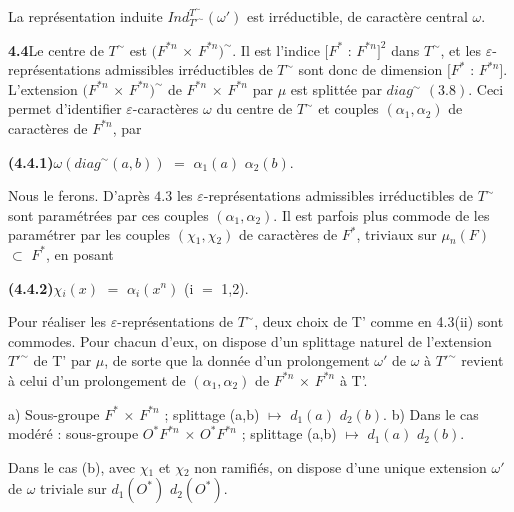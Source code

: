 \documentclass[10pt,a4paper]{article}
\begin{document}
\clearpage
{}
\label{d035-physical-020}
\par La représentation induite $Ind_{T'^\sim}^{T^\sim}(\omega{}')$ est irréductible, de caractère central $\omega{}$.\par
\par\noindent\textbf{4.4}\quad Le centre de $T^\sim$ est $(F^{*n}$ $\times{}$ $F^{*n})^\sim$. Il est l'indice $[F^*$ : $F^{*n}]^2$ dans $T^\sim$, et les $\varepsilon{}$-représentations admissibles irréductibles de $T^\sim$ sont donc de dimension $[F^*$ : $F^{*n}]$. L'extension $(F^{*n}$ $\times{}$ $F^{*n})^\sim$ de $F^{*n}$ $\times{}$ $F^{*n}$ par $\mu{}$ est splittée par $diag^\sim$ $(3.8)$. Ceci permet d'identifier $\varepsilon{}$-caractères $\omega{}$ du centre de $T^\sim$ et couples $(\alpha{}_1,\alpha{}_2)$ de caractères de $F^{*n}$, par\par
\par\noindent\textbf{(4.4.1)}\quad $\omega{}(diag^\sim(a,b))$ $=$ $\alpha{}_1(a)$ $\alpha{}_2(b)$.\par
\par Nous le ferons. D'après $4.3$ les $\varepsilon{}$-représentations admissibles irréductibles de $T^\sim$ sont paramétrées par ces couples $(\alpha{}_1,\alpha{}_2)$. Il est parfois plus commode de les paramétrer par les couples $(\chi{}_1,\chi{}_2)$ de caractères de $F^*$, triviaux sur $\mu{}_n(F)$ $\subset{}$ $F^*$, en posant\par
\par\noindent\textbf{(4.4.2)}\quad $\chi{}_i(x)$ $=$ $\alpha{}_i(x^n)$ (i $=$ 1,2).\par
\par Pour réaliser les $\varepsilon{}$-représentations de $T^\sim$, deux choix de T' comme en 4.3(ii) sont commodes. Pour chacun d'eux, on dispose d'un splittage naturel de l'extension $T'^\sim$ de T' par $\mu{}$, de sorte que la donnée d'un prolongement $\omega{}'$ de $\omega{}$ à $T'^\sim$ revient à celui d'un prolongement de $(\alpha{}_1,\alpha{}_2)$ de $F^{*n}$ $\times{}$ $F^{*n}$ à T'.\par
\par a) Sous-groupe $F^*$ $\times{}$ $F^{*n}$ ; splittage (a,b) $\mapsto{}$ $d_1(a)$ $d_2(b)$. b) Dans le cas modéré : sous-groupe $O^*F^{*n}$ $\times{}$ $O^*F^{*n}$ ; splittage (a,b) $\mapsto{}$ $d_1(a)$ $d_2(b)$.\par
\par Dans le cas (b), avec $\chi{}_1$ et $\chi{}_2$ non ramifiés, on dispose d'une unique extension $\omega{}'$ de $\omega{}$ triviale sur $d_1(O^*)$ $d_2(O^*)$.\par
\end{document}
